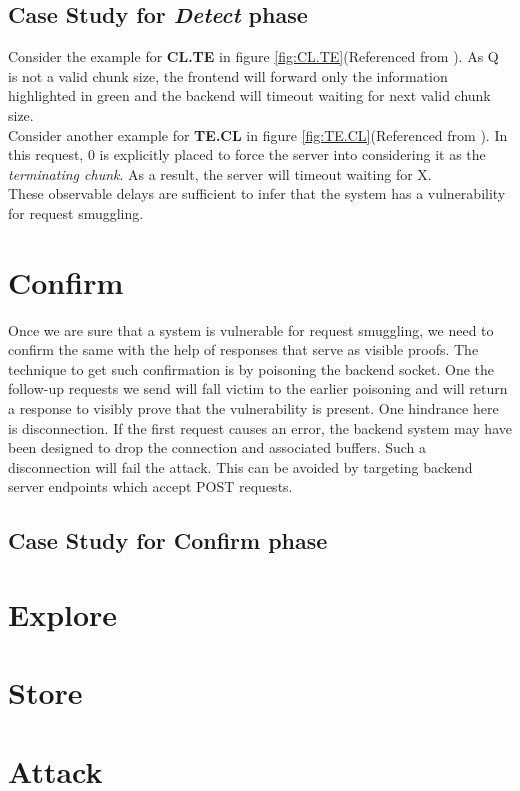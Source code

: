 \subsection{Case Study for \textit{Detect} phase}

Consider the example for \textbf{CL.TE} in figure \ref{fig:CL.TE}(Referenced from \cite{b6}). As \textcolor{myred}{Q} is not a valid chunk size, the frontend will forward only the information highlighted in \textcolor{mygreen}{green} and the backend will timeout waiting for next valid chunk size. \\
Consider another example for \textbf{TE.CL} in figure \ref{fig:TE.CL}(Referenced from \cite{b6}). In this request, \textcolor{mygreen}{0} is explicitly placed to force the server into considering it as the \textit{terminating chunk}. As a result, the server will timeout waiting for \textcolor{myred}{X}.\\
These observable delays are sufficient to infer that the system has a vulnerability for request smuggling.\\

\section{Confirm}
Once we are sure that a system is vulnerable for request smuggling, we need to confirm the same with the help of responses that serve as visible proofs. The technique to get such confirmation is by poisoning the backend socket. One the follow-up requests we send will fall victim to the earlier poisoning and will return a response to visibly prove that the vulnerability is present. One hindrance here is disconnection. If the first request causes an error, the backend system may have been designed to drop the connection and associated buffers. Such a disconnection will fail the attack. This can be avoided by targeting backend server endpoints which accept POST requests. 
\subsection{Case Study for Confirm phase}

\section{Explore}
\section{Store}
\section{Attack}